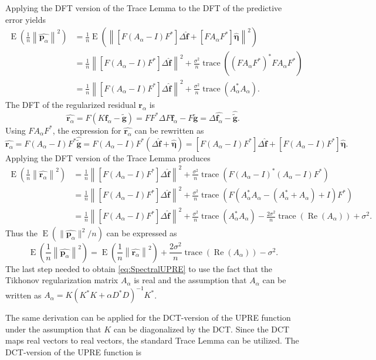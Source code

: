 \documentclass[12pt,notitlepage]{report}
\newcommand{\gnoiseVec}{\widetilde{\mathbf{g}}}	%
\newcommand{\kMat}{K}	%
\newcommand{\fVec}{\mathbf{f}}	%
\newcommand{\ctrans}{*}	%
\DeclareMathOperator{\trace}{trace}		%
\newcommand{\dft}[1]{\widehat{#1}}	%
\newcommand{\regparam}{\alpha}
\newcommand{\regf}{\fVec_{\regparam}}	%
\newcommand{\noise}{\eta}	%
\newcommand{\noiseSD}{\sigma}	%
\newcommand{\noiseVec}{\bm{\noise}}	%
\DeclareMathOperator{\E}{E}	%
\renewcommand{\Re}{\operatorname{Re}}	%
\newcommand{\PE}{\mathbf{p}_{\regparam}}	%
\newcommand{\regres}{\mathbf{r}_{\regparam}}	%
\newcommand{\A}{A_{\regparam}}	%
\begin{document}
Applying the DFT version of the Trace Lemma to the DFT of the predictive error yields
\begin{align*}
\E\left(\frac{1}{n}\left\|\dft{\PE}\right\|^2\right) &= \frac{1}{n}\E\left(\left\|[F(\A - I)F^\ctrans]\Delta\dft{\fVec} + [F\A{F^\ctrans}]\dft{\noiseVec}\right\|^2\right) \\
&= \frac{1}{n}\left\|[F(\A - I)F^\ctrans]\Delta\dft{\fVec}\right\|^2 + \frac{\noiseSD^2}{n}\trace\left((F\A{F^\ctrans})^\ctrans{F\A{F^\ctrans}}\right) \\
&= \frac{1}{n}\left\|[F(\A - I)F^\ctrans]\Delta\dft{\fVec}\right\|^2 + \frac{\noiseSD^2}{n}\trace\left(\A^\ctrans\A\right).
\end{align*}
The DFT of the regularized residual $\regres$ is
\[\dft{\regres} = F(\kMat\regf - \gnoiseVec) = FF^\ctrans\Delta{F}\regf - F\gnoiseVec = \Delta\dft{\regf} - \dft{\gnoiseVec}.\]
Using $F{\A}F^\ctrans$, the expression for $\dft{\regres}$ can be rewritten as
\[\dft{\regres} = F(\A - I){F^\ctrans}\dft{\gnoiseVec} = F(\A - I){F^\ctrans}(\Delta\dft{\fVec} + \dft{\noiseVec}) = [F(\A - I){F^\ctrans}]\Delta\dft{\fVec} + [F(\A - I){F^\ctrans}]\dft{\noiseVec}.\]
Applying the DFT version of the Trace Lemma produces
\begin{align*}
\E\left(\frac{1}{n}\left\|\dft{\regres}\right\|^2\right) &= \frac{1}{n}\left\|[F(\A - I)F^\ctrans]\Delta\dft{\fVec}\right\|^2 + \frac{\noiseSD^2}{n}\trace\left(F(\A - I)^\ctrans(\A - I){F^\ctrans}\right) \\
&= \frac{1}{n}\left\|[F(\A - I)F^\ctrans]\Delta\dft{\fVec}\right\|^2 + \frac{\noiseSD^2}{n}\trace\left(F(\A^\ctrans\A - (\A^\ctrans + \A) + I){F^\ctrans}\right) \\
&= \frac{1}{n}\left\|[F(\A - I)F^\ctrans]\Delta\dft{\fVec}\right\|^2 + \frac{\noiseSD^2}{n}\trace\left(\A^\ctrans\A\right) - \frac{2\noiseSD^2}{n}\trace\left(\Re(\A)\right) + \noiseSD^2.
\end{align*}
Thus the $\E(\|\dft{\PE}\|^2/n)$ can be expressed as
\[\E\left(\frac{1}{n}\left\|\dft{\PE}\right\|^2\right) = \E\left(\frac{1}{n}\left\|\dft{\regres}\right\|^2\right) + \frac{2\noiseSD^2}{n}\trace\left(\Re(\A)\right) - \noiseSD^2.\]
The last step needed to obtain \eqref{eq:SpectralUPRE} to use the fact that the Tikhonov regularization matrix $\A$ is real and the assumption that $\A$ can be written as $\A = \kMat(\kMat^\ctrans\kMat + \regparam{D^\ctrans}D)^{-1}\kMat^\ctrans$. \par
The same derivation can be applied for the DCT-version of the UPRE function under the assumption that $\kMat$ can be diagonalized by the DCT. Since the DCT maps real vectors to real vectors, the standard Trace Lemma can be utilized. The DCT-version of the UPRE function is
\end{document}
